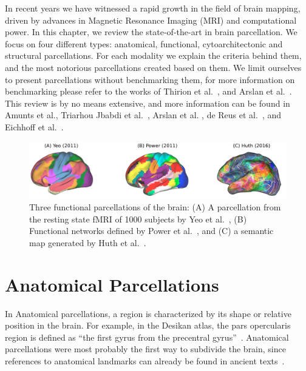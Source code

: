 In recent years we have witnessed a rapid growth in the field of brain mapping,
driven by advances in Magnetic Resonance Imaging (MRI) and computational power.
In this chapter, we review the state-of-the-art in brain parcellation. We focus
on four different types: anatomical, functional, cytoarchitectonic and structural
parcellations. For each modality we explain the criteria behind them, and the
most notorious parcellations created based on them. We limit ourselves to present
parcellations without benchmarking them, for more information on benchmarking
please refer to the works of Thirion et al.~\cite{Thirion2014}, and Arslan et al.~\cite{Arslan2018}.
This review is by no means extensive, and more information can be found in
Amunts et al.\cite{Amunts2007}, Triarhou \cite{Triarhou2007} 
Jbabdi et al.~\cite{Jbabdi2013}, Arslan et al. \cite{Arslan2018},
de Reus et al.~\cite{DeReus2013}, and Eichhoff et al.~\cite{Eickhoff2015, Eickhoff2018a}.



\begin{figure}[t]
    \includegraphics[width=\textwidth]{4.brain_parcellation/img/functional.png}
    \caption{Three functional parcellations of the brain: (A) A parcellation from
             the resting state fMRI of 1000 subjects by Yeo et al.~\cite{Yeo2011},
             (B) Functional networks defined by Power et al.~\cite{Power2011},
             and (C) a semantic map generated by Huth et al.~\cite{Huth2016}.}
    \label{fig:brain_function}
\end{figure}

\section{Anatomical Parcellations}
\label{sec:anatomical}

In Anatomical parcellations, a region is characterized by its shape or
relative position in the brain. For example, in the Desikan atlas, the pars
opercularis region is defined as ``the first gyrus from the precentral
gyrus''~\cite{Desikan2006}. Anatomical parcellations were most probably the first
way to subdivide the brain, since references to anatomical landmarks can already
be found in ancient texts~\cite{Elsberg1945, Collice2008}.

